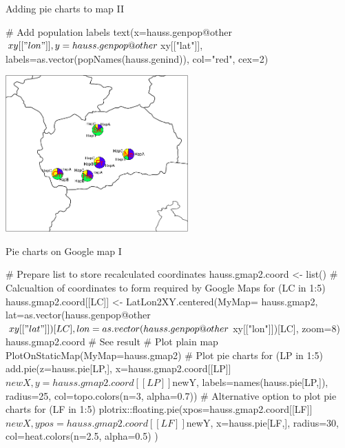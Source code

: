 \documentclass[compress, ucs, xelatex, 11pt, xcolor=svgnames,
  hyperref={
    bookmarks=true,
    unicode=true,
    colorlinks=true,
    pdftitle={Molecular data in R},
    plainpages=false,
    pdfauthor={Vojtech Zeisek},
    pdfsubject={Course about phylogeny and evolution in R},
    pdfcreator={XeLaTeX},
    pdfkeywords={R, evolution, phylogeny, molecular data},
    linkcolor=Tomato,
    anchorcolor=SaddleBrown,
    citecolor=Goldenrod,
    filecolor=DarkMagenta,
    menucolor=Sienna,
    urlcolor=DarkTurquoise,
    pdftex},
  url={hyphens, lowtilde} %
  ]{beamer}
\begin{document}
\begin{frame}[fragile]{Adding pie charts to map II}
  \begin{spluscode}
    # Add population labels
    text(x=hauss.genpop@other$xy[["lon"]], y=hauss.genpop@other$xy[["lat"]],
      labels=as.vector(popNames(hauss.genind)), col="red", cex=2)
  \end{spluscode}
  \begin{center}
    \includegraphics[height=6cm]{map_pie.png}
  \end{center}
\end{frame}

\begin{frame}[fragile]{Pie charts on Google map I}
  \begin{spluscode}
    # Prepare list to store recalculated coordinates
    hauss.gmap2.coord <- list()
    # Calcualtion of coordinates to form required by Google Maps
    for (LC in 1:5) { hauss.gmap2.coord[[LC]] <- LatLon2XY.centered(MyMap=
      hauss.gmap2, lat=as.vector(hauss.genpop@other$xy[["lat"]])[LC],
      lon=as.vector(hauss.genpop@other$xy[["lon"]])[LC], zoom=8) }
    hauss.gmap2.coord # See result
    # Plot plain map
    PlotOnStaticMap(MyMap=hauss.gmap2)
    # Plot pie charts
    for (LP in 1:5) { add.pie(z=hauss.pie[LP,], x=hauss.gmap2.coord[[LP]]
      $newX, y=hauss.gmap2.coord[[LP]]$newY, labels=names(hauss.pie[LP,]),
      radius=25, col=topo.colors(n=3, alpha=0.7)) }
    # Alternative option to plot pie charts
    for (LF in 1:5) { plotrix::floating.pie(xpos=hauss.gmap2.coord[[LF]]
      $newX, ypos=hauss.gmap2.coord[[LF]]$newY, x=hauss.pie[LF,], radius=30,
      col=heat.colors(n=2.5, alpha=0.5) ) }
  \end{spluscode}
\end{frame}
\end{document}
